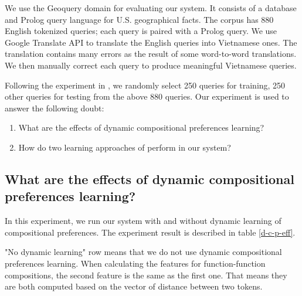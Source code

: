 \label{sec:experiment}
We use the Geoquery domain for evaluating our system. It consists of a database and Prolog query language for U.S. geographical facts. The corpus has 880 English tokenized queries; each query is paired with a Prolog query. We use Google Translate API to translate the English queries into Vietnamese ones. The translation contains many errors as the result of some word-to-word translations. We then manually correct each query to produce meaningful Vietnamese queries. 

Following the experiment in \cite{Clarke:2010:DSP:1870568.1870571}, we randomly select 250 queries for training, 250 other queries for testing from the above 880 queries. Our experiment is used to answer the following doubt:

\begin{enumerate}
  \item What are the effects of dynamic compositional preferences learning?
  \item How do two learning approaches of \cite{Clarke:2010:DSP:1870568.1870571} perform in our system?
\end{enumerate}

\subsection{What are the effects of dynamic compositional preferences learning?}
In this experiment, we run our system with and without dynamic learning of compositional preferences. The experiment result is described in table \ref{d-c-p-eff}. 

"No dynamic learning" row means that we do not use dynamic compositional preferences learning. When calculating the features for function-function compositions, the second feature is the same as the first one. That means they are both computed based on the vector of distance between two tokens.

